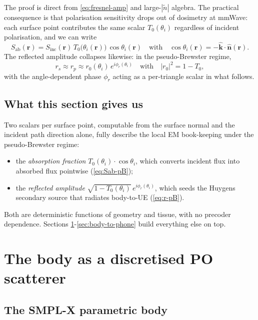 \documentclass[11pt,a4paper]{article}
\theoremstyle{definition}
\newcommand{\khat}{\hat{\bm{k}}}
\newcommand{\nhat}{\hat{\bm{n}}}
\newcommand{\rr}{\mathbf{r}}
\newcommand{\Sinc}{S_{\mathrm{inc}}}
\newcommand{\Sab}{S_{\mathrm{ab}}}
\begin{document}
The proof is direct from \cref{eq:fresnel-amp} and large-$|\tilde
n|$ algebra.  The practical consequence is that polarisation
sensitivity drops out of dosimetry at mmWave: each surface point
contributes the same scalar $T_0(\theta_i)$ regardless of
incident polarisation, and we can write
\begin{equation}\label{eq:Sab-pB}
  \Sab(\rr) = \Sinc(\rr)\,T_0\bigl(\theta_i(\rr)\bigr)
  \,\cos\theta_i(\rr)
  \quad
  \text{with}
  \quad
  \cos\theta_i(\rr)=-\khat\cdot\nhat(\rr).
\end{equation}
The reflected amplitude collapses likewise: in the
pseudo-Brewster regime,
\begin{equation}\label{eq:r-pB}
  r_s\approx r_p\approx r_0(\theta_i)\,e^{i\phi_r(\theta_i)}
  \quad \text{with}\quad |r_0|^2 = 1-T_0,
\end{equation}
with the angle-dependent phase $\phi_r$ acting as a per-triangle
scalar in what follows.

\subsection{What this section gives us}

Two scalars per surface point, computable from the surface normal
and the incident path direction alone, fully describe the local
EM book-keeping under the pseudo-Brewster regime:
\begin{itemize}[leftmargin=1.6em,itemsep=2pt]
\item the \emph{absorption fraction} $T_0(\theta_i)\cdot\cos\theta_i$,
which converts incident flux into absorbed flux pointwise
(\cref{eq:Sab-pB});
\item the \emph{reflected amplitude}
$\sqrt{1-T_0(\theta_i)}\,e^{i\phi_r(\theta_i)}$, which seeds the
Huygens secondary source that radiates body-to-UE
(\cref{eq:r-pB}).
\end{itemize}
Both are deterministic functions of geometry and tissue, with no
precoder dependence.  Sections \ref{sec:po}-\ref{sec:body-to-phone}
build everything else on top.

\section{The body as a discretised PO scatterer}\label{sec:po}

\subsection{The SMPL-X parametric body}
\end{document}
